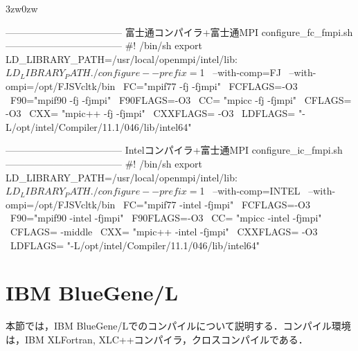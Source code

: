 \begin{itemize}
\begin{indentation}{3zw}{0zw}
\begin{program}
------------------------------------
富士通コンパイラ+富士通MPI  configure_fc_fmpi.sh
------------------------------------
#! /bin/sh
export LD_LIBRARY_PATH=/usr/local/openmpi/intel/lib:$LD_LIBRARY_PATH
 ./configure --prefix=$1 \
             --with-comp=FJ \
             --with-ompi=/opt/FJSVcltk/bin \
             FC="mpif77 -fj -fjmpi" \
             FCFLAGS=-O3 \
             F90="mpif90 -fj -fjmpi" \
             F90FLAGS=-O3 \
             CC= "mpicc -fj -fjmpi" \
             CFLAGS= -O3 \
             CXX= "mpic++ -fj -fjmpi" \
             CXXFLAGS= -O3 \
             LDFLAGS= "-L/opt/intel/Compiler/11.1/046/lib/intel64" \

------------------------------------
Intelコンパイラ+富士通MPI  configure_ic_fmpi.sh
------------------------------------
#! /bin/sh
export LD_LIBRARY_PATH=/usr/local/openmpi/intel/lib:$LD_LIBRARY_PATH
 ./configure --prefix=$1 \
             --with-comp=INTEL \
             --with-ompi=/opt/FJSVcltk/bin \
             FC="mpif77 -intel -fjmpi" \
             FCFLAGS=-O3 \
             F90="mpif90 -intel -fjmpi" \
             F90FLAGS=-O3 \
             CC= "mpicc -intel -fjmpi" \
             CFLAGS= -middle \
             CXX= "mpic++ -intel -fjmpi" \
             CXXFLAGS= -O3 \
             LDFLAGS= "-L/opt/intel/Compiler/11.1/046/lib/intel64" \
\end{program}
\end{indentation}


\end{itemize}


%
\hypertarget{tgt:BGL}{\section{IBM BlueGene/L}}

本節では，IBM BlueGene/L\index{BlueGene}でのコンパイルについて説明する．コンパイル環境は，IBM XLFortran, XLC++コンパイラ，クロスコンパイルである．

